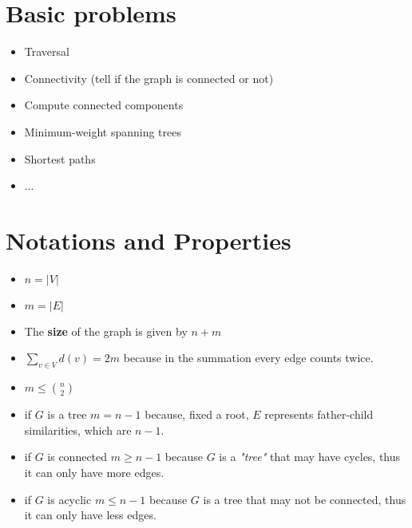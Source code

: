 \section{Basic problems}
\begin{itemize}
    \item Traversal
    \item Connectivity (tell if the graph is connected or not)
    \item Compute connected components
    \item Minimum-weight spanning trees
    \item Shortest paths
    \item ...
\end{itemize}

\section{Notations and Properties}
\begin{itemize}
    \item $n = |V|$
    \item $m = |E|$
    \item The \textbf{size} of the graph is given by $n + m$
    \item $\sum_{v \in V}d(v) = 2m$ because in the summation every edge counts twice.
    \item $m \leq \binom{n}{2}$
    \item if $G$ is a tree $m = n - 1$ because, fixed a root, $E$ represents father-child similarities, which are $n - 1$.
    \item if $G$ is connected $m \geq n - 1$ because $G$ is a \textit{"tree"} that may have cycles, thus it can only have more edges.
    \item if $G$ is acyclic $m \leq n - 1$ because $G$ is a tree that may not be connected, thus it can only have less edges.
\end{itemize}

